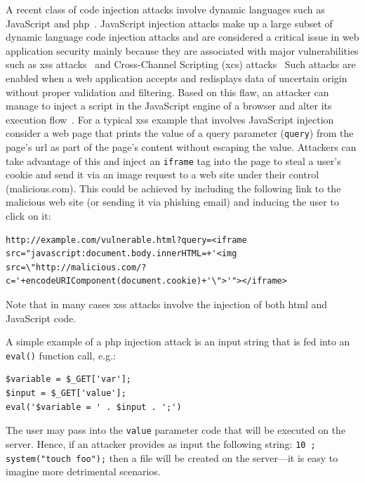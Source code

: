 \documentclass[10pt,journal,compsoc]{IEEEtran}
\begin{document}
A recent class of code injection attacks involve dynamic languages
such as JavaScript and {\sc php}~\cite{SFVM09,SMS13}.
JavaScript injection attacks make up a large subset of dynamic
language code injection attacks and are considered a critical issue
in web application security mainly because they are associated with
major vulnerabilities such as {\sc xss} attacks~\cite{SG07} and
Cross-Channel Scripting ({\sc xcs}) attacks~\cite{W10,BBB09}
Such attacks are enabled when a web application accepts
and redisplays data of uncertain origin without
proper validation and filtering. Based on this flaw, an attacker
can manage to inject a script in the JavaScript engine of a browser
and alter its execution flow~\cite{ELX07}.
For a typical {\sc xss} example that involves JavaScript injection
consider a web page that prints the value
of a query parameter ({\tt query}) from the
page's {\sc url} as part of the page's content
without escaping the value. Attackers
can take advantage of this and inject an {\tt iframe} tag
into the page to steal a user's cookie and
send it via an image request to a web site
under their control (malicious.com).
This could be achieved by including the following
link to the malicious web site (or sending it via phishing
email) and inducing the user to click on it:

\lstset{language=HTML}
\begin{lstlisting}
http://example.com/vulnerable.html?query=<iframe src="javascript:document.body.innerHTML=+'<img src=\"http://malicious.com/?c='+encodeURIComponent(document.cookie)+'\">'"></iframe>
\end{lstlisting}

\noindent
Note that in many cases {\sc xss} attacks
involve the injection of both {\sc html} and JavaScript code.

A simple example of a {\sc php} injection attack is an input string
that is fed into an {\tt eval()} function call, e.g.:

\lstset{language=PHP}
\begin{lstlisting}
$variable = $_GET['var']; 
$input = $_GET['value'];
eval('$variable = ' . $input . ';')
\end{lstlisting}

\noindent
The user may pass into the {\tt value} parameter code that will
be executed on the server. Hence, if an attacker provides as
input the following string: {\tt 10 ; system("touch foo");}
then a file will be created on the server---it is easy
to imagine more detrimental scenarios.
\end{document}
